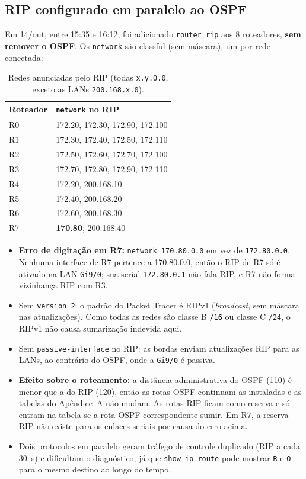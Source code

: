 \documentclass[12pt,a4paper]{article}
\begin{document}
\subsection{RIP configurado em paralelo ao OSPF}\label{sec:rip}
Em 14/out, entre 15:35 e 16:12, foi adicionado \texttt{router rip} aos 8 roteadores, \textbf{sem remover o OSPF}. Os \texttt{network} são classful (sem máscara), um por rede conectada:
\begin{table}[H]\centering\small
\begin{tabular}{@{}ll@{}}\toprule
Roteador & \texttt{network} no RIP\\\midrule
R0 & 172.20, 172.30, 172.90, 172.100\\
R1 & 172.30, 172.40, 172.50, 172.110\\
R2 & 172.50, 172.60, 172.70, 172.100\\
R3 & 172.70, 172.80, 172.90, 172.110\\
R4 & 172.20, 200.168.10\\
R5 & 172.40, 200.168.20\\
R6 & 172.60, 200.168.30\\
R7 & \textbf{170.80}, 200.168.40\\ \bottomrule
\end{tabular}
\caption{Redes anunciadas pelo RIP (todas \texttt{x.y.0.0}, exceto as LANs \texttt{200.168.x.0}).}
\end{table}
\begin{itemize}[nosep]
\item \textbf{Erro de digitação em R7:} \texttt{network 170.80.0.0} em vez de \texttt{172.80.0.0}. Nenhuma interface de R7 pertence a 170.80.0.0, então o RIP de R7 só é ativado na LAN \texttt{Gi9/0}; sua serial \texttt{172.80.0.1} não fala RIP, e R7 não forma vizinhança RIP com R3.
\item Sem \texttt{version 2}: o padrão do Packet Tracer é RIPv1 (\textit{broadcast}, sem máscara nas atualizações). Como todas as redes são classe B \texttt{/16} ou classe C \texttt{/24}, o RIPv1 não causa sumarização indevida aqui.
\item Sem \texttt{passive-interface} no RIP: as bordas enviam atualizações RIP para as LANs, ao contrário do OSPF, onde a \texttt{Gi9/0} é passiva.
\item \textbf{Efeito sobre o roteamento:} a distância administrativa do OSPF (110) é menor que a do RIP (120), então as rotas OSPF continuam as instaladas e as tabelas do Apêndice~A não mudam. As rotas RIP ficam como reserva e só entram na tabela se a rota OSPF correspondente sumir. Em R7, a reserva RIP não existe para os enlaces seriais por causa do erro acima.
\item Dois protocolos em paralelo geram tráfego de controle duplicado (RIP a cada 30~s) e dificultam o diagnóstico, já que \texttt{show ip route} pode mostrar \texttt{R} e \texttt{O} para o mesmo destino ao longo do tempo.
\end{itemize}
\end{document}
